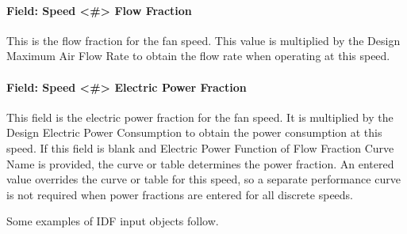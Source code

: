 \paragraph{Field: Speed <\#> Flow Fraction}\label{field-speed-flow-fraction-fansysmodel}

This is the flow fraction for the fan speed. This value is multiplied by the Design Maximum Air Flow Rate to obtain the flow rate when operating at this speed.

\paragraph{Field: Speed <\#> Electric Power Fraction}\label{field-speed-power-fraction-fansysmodel}

This field is the electric power fraction for the fan speed. It is multiplied by the Design Electric Power Consumption to obtain the power consumption at this speed. If this field is blank and Electric Power Function of Flow Fraction Curve Name is provided, the curve or table determines the power fraction. An entered value overrides the curve or table for this speed, so a separate performance curve is not required when power fractions are entered for all discrete speeds.

Some examples of IDF input objects follow.

